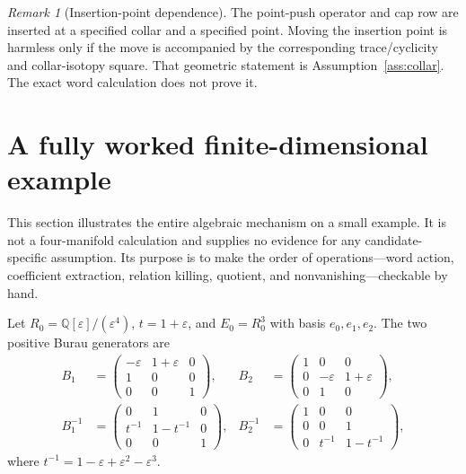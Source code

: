 \documentclass[10pt,reqno]{amsart}
\theoremstyle{definition}
\theoremstyle{remark}
\newtheorem{remark}[theorem]{Remark}
\newcommand{\Q}{\mathbb Q}
\newcommand{\eps}{\varepsilon}
\begin{document}
\begin{remark}[Insertion-point dependence]\label{rem:insertion-point}
The point-push operator and cap row are inserted at a specified collar and a
specified point.  Moving the insertion point is harmless only if the move is
accompanied by the corresponding trace/cyclicity and collar-isotopy square.
That geometric statement is Assumption~\ref{ass:collar}.  The exact word
calculation does not prove it.
\end{remark}

\section{A fully worked finite-dimensional example}\label{sec:toy-example}

This section illustrates the entire algebraic mechanism on a small example.
It is not a four-manifold calculation and supplies no evidence for any
candidate-specific assumption.  Its purpose is to make the order of
operations---word action, coefficient extraction, relation killing, quotient,
and nonvanishing---checkable by hand.

Let $R_0=\Q[\eps]/(\eps^4)$, $t=1+\eps$, and $E_0=R_0^3$ with basis
$e_0,e_1,e_2$.  The two positive Burau generators are
\begin{align}
B_1&=
\begin{pmatrix}
-\eps&1+\eps&0\\
1&0&0\\
0&0&1
\end{pmatrix},
&
B_2&=
\begin{pmatrix}
1&0&0\\
0&-\eps&1+\eps\\
0&1&0
\end{pmatrix},
\label{eq:toy-positive}\\
B_1^{-1}&=
\begin{pmatrix}
0&1&0\\
t^{-1}&1-t^{-1}&0\\
0&0&1
\end{pmatrix},
&
B_2^{-1}&=
\begin{pmatrix}
1&0&0\\
0&0&1\\
0&t^{-1}&1-t^{-1}
\end{pmatrix},
\label{eq:toy-negative}
\end{align}
where $t^{-1}=1-\eps+\eps^2-\eps^3$.
\end{document}
